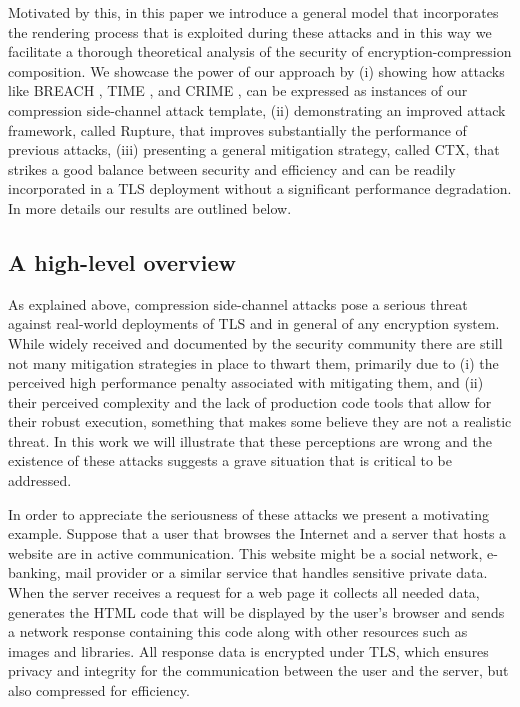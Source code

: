 \documentclass[conference, letterpaper, 10pt]{IEEEtran}
\begin{document}
Motivated by this, in this paper we introduce
a general model that incorporates the rendering process that is exploited
during these attacks and in this way we facilitate a thorough
theoretical analysis of the security of encryption-compression composition.
We showcase the power of our approach 
by (i) showing how attacks like  BREACH \cite{c2}, TIME \cite{c3}, and CRIME \cite{c4}, can be expressed
as instances of our compression side-channel attack template,
(ii) demonstrating an improved attack framework, called Rupture,
that improves substantially the performance of previous attacks,
(iii) presenting a general mitigation strategy, called CTX, that strikes
a good balance between security and efficiency and can be readily incorporated
in a TLS deployment without a significant performance degradation.
In more details our results are outlined below.

\subsection{A high-level overview}\label{subsec:example}
As explained above,  compression side-channel attacks pose a serious threat
against real-world deployments of TLS and in general of
any encryption system. While widely received and documented
by the security community there are still not many mitigation strategies in place
to thwart them, primarily due to (i) the perceived high performance
penalty associated with mitigating them, and
(ii) their perceived complexity and
the lack of production code tools
that allow for their robust execution, something that makes some believe
they are not a realistic threat. In this work we will illustrate that
these perceptions  are wrong
and the existence of these attacks
suggests  a grave situation that is critical to be addressed.

In order to appreciate the seriousness of these attacks we present a motivating
example.
Suppose that  a  user that browses the Internet and a server
that hosts a website are in active communication.
This website might be a social network, e-banking, mail
provider or a similar service that handles sensitive private data. When the
server receives a request for a web page it collects all needed data, generates
the HTML code that will be displayed by the user's browser and sends a network
response containing this code along with other resources such as images and
libraries. All response data is encrypted under TLS, which ensures privacy and
integrity for the communication between the user and the server,
but also compressed for efficiency.
\end{document}
